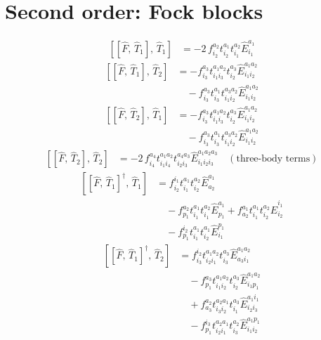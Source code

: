 \documentclass[11pt]{article}
\begin{document}
\section{Second order: Fock blocks}
\begin{align}
\left[\left[\hat{F},\, \hat{T}_{1}\right],\, \hat{T}_{1}\right] &= - 2\, f^{a_{2}}_{i_{2}} t^{a_{1}}_{i_{2}} t^{a_{2}}_{i_{1}} \hat{E}^{a_{1}}_{i_{1}}
\end{align}
\begin{align}
\left[\left[\hat{F},\, \hat{T}_{1}\right],\, \hat{T}_{2}\right] &= - f^{a_{3}}_{i_{3}} t^{a_{1}a_{2}}_{i_{1}i_{3}} t^{a_{3}}_{i_{2}} \hat{E}^{a_{1}a_{2}}_{i_{1}i_{2}} \\
&\quad - f^{a_{3}}_{i_{3}} t^{a_{1}}_{i_{3}} t^{a_{3}a_{2}}_{i_{1}i_{2}} \hat{E}^{a_{1}a_{2}}_{i_{1}i_{2}}
\end{align}
\begin{align}
\left[\left[\hat{F},\, \hat{T}_{2}\right],\, \hat{T}_{1}\right] &= - f^{a_{3}}_{i_{3}} t^{a_{1}a_{2}}_{i_{1}i_{3}} t^{a_{3}}_{i_{2}} \hat{E}^{a_{1}a_{2}}_{i_{1}i_{2}} \\
&\quad - f^{a_{3}}_{i_{3}} t^{a_{1}}_{i_{3}} t^{a_{3}a_{2}}_{i_{1}i_{2}} \hat{E}^{a_{1}a_{2}}_{i_{1}i_{2}}
\end{align}
\begin{align}
\left[\left[\hat{F},\, \hat{T}_{2}\right],\, \hat{T}_{2}\right] &= - 2\, f^{a_{4}}_{i_{4}} t^{a_{1}a_{2}}_{i_{1}i_{4}} t^{a_{4}a_{3}}_{i_{2}i_{3}} \hat{E}^{a_{1}a_{2}a_{3}}_{i_{1}i_{2}i_{3}}\quad (\text{three-body terms})
\end{align}
\begin{align}
\left[\left[\hat{F},\, \hat{T}_{1}\right]^{\dagger},\, \hat{T}_{1}\right] &= f^{i_{1}}_{i_{2}} t^{a_{1}}_{i_{1}} t^{a_{2}}_{i_{2}} \hat{E}^{a_{1}}_{a_{2}} \\
&\quad - f^{a_{2}}_{p_{1}} t^{a_{1}}_{i_{1}} t^{a_{2}}_{i_{1}} \hat{E}^{a_{1}}_{p_{1}} + f^{a_{1}}_{a_{2}} t^{a_{1}}_{i_{1}} t^{a_{2}}_{i_{2}} \hat{E}^{i_{1}}_{i_{2}} \\
&\quad - f^{i_{2}}_{p_{1}} t^{a_{1}}_{i_{1}} t^{a_{1}}_{i_{2}} \hat{E}^{p_{1}}_{i_{1}}
\end{align}
\begin{align}
\left[\left[\hat{F},\, \hat{T}_{1}\right]^{\dagger},\, \hat{T}_{2}\right] &= f^{i_{2}}_{i_{3}} t^{a_{1}a_{2}}_{i_{2}i_{1}} t^{a_{3}}_{i_{3}} \hat{E}^{a_{1}a_{2}}_{a_{3}i_{1}} \\
&\quad - f^{a_{3}}_{p_{1}} t^{a_{1}a_{2}}_{i_{1}i_{2}} t^{a_{3}}_{i_{2}} \hat{E}^{a_{1}a_{2}}_{i_{1}p_{1}} \\
&\quad + f^{a_{2}}_{a_{3}} t^{a_{2}a_{1}}_{i_{3}i_{2}} t^{a_{3}}_{i_{1}} \hat{E}^{a_{1}i_{1}}_{i_{2}i_{3}} \\
&\quad - f^{i_{3}}_{p_{1}} t^{a_{2}a_{1}}_{i_{2}i_{1}} t^{a_{2}}_{i_{3}} \hat{E}^{a_{1}p_{1}}_{i_{1}i_{2}}
\end{align}
\end{document}
